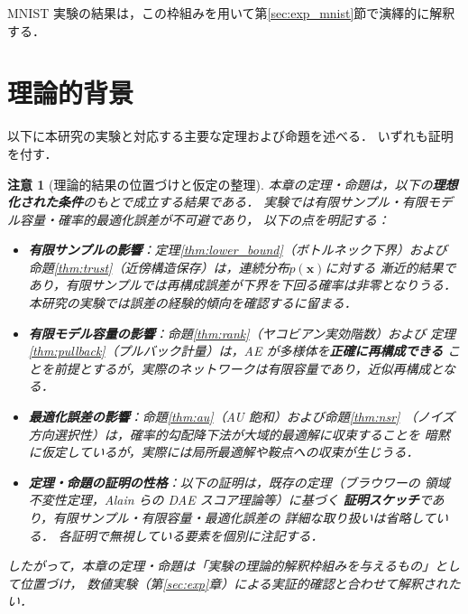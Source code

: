 \documentclass[12pt,a4paper]{jsarticle}
\newtheorem{remark}{注意}
\begin{document}
MNIST 実験の結果は，この枠組みを用いて第\ref{sec:exp_mnist}節で演繹的に解釈する．

\section{理論的背景}\label{sec:theory}

以下に本研究の実験と対応する主要な定理および命題を述べる．
いずれも証明を付す．

\begin{remark}[理論的結果の位置づけと仮定の整理]\label{rem:theory_assumptions}
本章の定理・命題は，以下の\textbf{理想化された条件}のもとで成立する結果である．
実験では有限サンプル・有限モデル容量・確率的最適化誤差が不可避であり，
以下の点を明記する：
\begin{itemize}
  \item \textbf{有限サンプルの影響}：定理\ref{thm:lower_bound}（ボトルネック下界）および
        命題\ref{thm:trust}（近傍構造保存）は，連続分布$p(\boldsymbol{x})$に対する
        漸近的結果であり，有限サンプルでは再構成誤差が下界を下回る確率は非零となりうる．
        本研究の実験では誤差の経験的傾向を確認するに留まる．
  \item \textbf{有限モデル容量の影響}：命題\ref{thm:rank}（ヤコビアン実効階数）および
        定理\ref{thm:pullback}（プルバック計量）は，AE が多様体を\textbf{正確に再構成できる}
        ことを前提とするが，実際のネットワークは有限容量であり，近似再構成となる．
  \item \textbf{最適化誤差の影響}：命題\ref{thm:au}（AU 飽和）および命題\ref{thm:nsr}
        （ノイズ方向選択性）は，確率的勾配降下法が大域的最適解に収束することを
        暗黙に仮定しているが，実際には局所最適解や鞍点への収束が生じうる．
  \item \textbf{定理・命題の証明の性格}：以下の証明は，既存の定理（ブラウワーの
        領域不変性定理，Alain らの DAE スコア理論\cite{alain2014dae}等）に基づく
        \textbf{証明スケッチ}であり，有限サンプル・有限容量・最適化誤差の
        詳細な取り扱いは省略している．
        各証明で無視している要素を個別に注記する．
\end{itemize}
したがって，本章の定理・命題は「実験の理論的解釈枠組みを与えるもの」として位置づけ，
数値実験（第\ref{sec:exp}章）による実証的確認と合わせて解釈されたい．
\end{remark}
\end{document}
